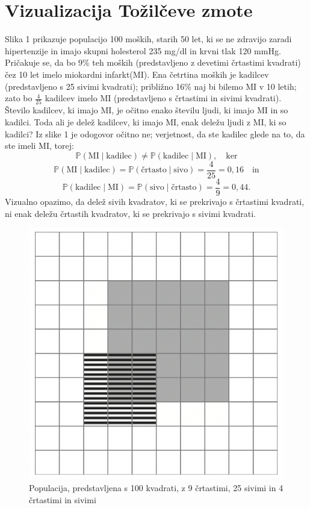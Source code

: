 \documentclass[a4paper,12pt]{article}
\begin{document}
\section{Vizualizacija Tožilčeve zmote}
Slika 1 prikazuje populacijo 100 moških, starih 50 let, ki se ne zdravijo zaradi hipertenzije in imajo skupni holesterol 235 mg/dl in krvni tlak 120 mmHg. Pričakuje
se, da bo 9\% teh moških (predstavljeno z devetimi črtastimi kvadrati) čez 10 let imelo miokardni infarkt(MI). Ena četrtina moških je kadilcev (predstavljeno s 25 
sivimi kvadrati); približno 16\% naj bi bilemo MI v 10 letih; zato bo $\frac{4}{25}$ kadilcev imelo MI (predstavljeno s črtastimi in sivimi kvadrati). \\
Število kadilcev, ki imajo MI, je očitno enako številu ljudi, ki imajo MI in so kadilci. Toda ali je delež kadilcev, ki imajo MI, enak deležu ljudi z MI, ki so kadilci? Iz 
slike 1 je odogovor očitno ne; verjetnost, da ste kadilec glede na to, da ste imeli MI, torej:
\[ \mathbb{P}(\text{MI} \mid \text{kadilec}) \ne \mathbb{P}(\text{kadilec} \mid \text{MI}), \quad \text{ker}\]
\[ \mathbb{P}(\text{MI} \mid \text{kadilec}) = \mathbb{P}(\text{črtasto} \mid \text{sivo}) = \frac{4}{25} = 0,16 \quad \text{in}\]
\[\mathbb{P}(\text{kadilec} \mid \text{MI}) = \mathbb{P}(\text{sivo} \mid \text{črtasto}) = \frac{4}{9} = 0,44.\]
Vizualno opazimo, da delež sivih kvadratov, ki se prekrivajo s črtastimi kvadrati, ni enak deležu črtastih kvadratov, ki se prekrivajo s sivimi kvadrati. 

\begin{figure}[!ht]
    \centering
    \label{fig:slika1}
    \includegraphics[scale=0.45]{slika1.png}
    \caption{Populacija, predstavljena s 100 kvadrati, z 9 črtastimi, 25 sivimi in 4 črtastimi in sivimi}\vspace{2mm}
 \end{figure}
\end{document}
